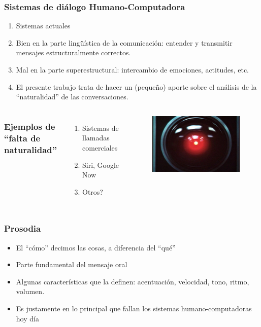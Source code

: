 \begin{frame}
  \frametitle{Sistemas de diálogo Humano-Computadora}

  \begin{enumerate}[<+->]
    \item Sistemas actuales
    \item Bien en la parte lingüística de la comunicación: entender y transmitir mensajes estructuralmente correctos.
    \item Mal en la parte superestructural: intercambio de emociones, actitudes, etc.
    \item El presente trabajo trata de hacer un (pequeño) aporte sobre el análisis de la ``naturalidad'' de las conversaciones.
  \end{enumerate}
\end{frame}


\begin{frame}
  \begin{columns}
    \frametitle{Ejemplos de ``falta de naturalidad''}
    \begin{enumerate}
      \item Sistemas de llamadas comerciales
      \item Siri, Google Now
      \item Otros?
    \end{enumerate}
    \begin{figure}
      \includegraphics[scale=0.25]{images/hal.jpg}
    \end{figure}
  \end{columns}
\end{frame}


\begin{frame}
  \frametitle{Prosodia}
  \begin{itemize}
    \item El ``cómo'' decimos las cosas, a diferencia del ``qué''
    \item Parte fundamental del mensaje oral
    \item Algunas características que la definen: acentuación, velocidad, tono, ritmo, volumen.
    \item Es justamente en lo principal que fallan los sistemas humano-computadoras hoy día
  \end{itemize}
\end{frame}




